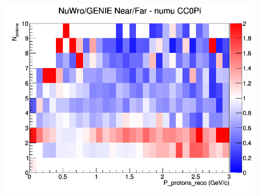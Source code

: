 \begin{figure}[h]
\endminipage
{}
\includegraphics[width=\linewidth]{eff_N_P/FGT/protons/ratios/CC0Pi_NuWro_GENIE_numu_NF_N_P.png}
\endminipage
\newline
\end{figure}
\clearpage
